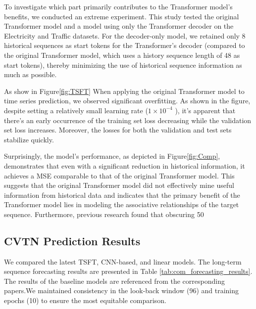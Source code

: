 To investigate which part primarily contributes to the Transformer model's benefits, we conducted an extreme experiment. This study tested the original Transformer model and a model using only the Transformer decoder on the Electricity and Traffic datasets. For the decoder-only model, we retained only 8 historical sequences as start tokens for the Transformer's decoder (compared to the original Transformer model, which uses a history sequence length of 48 as start tokens), thereby minimizing the use of historical sequence information as much as possible.

As show in Figure\ref{fig:TSFT} When applying the original Transformer model to time series prediction, we observed significant overfitting. As shown in the figure, despite setting a relatively small learning rate (\(1 \times 10^{-4}\)
), it's apparent that there's an early occurrence of the training set loss decreasing while the validation set loss increases. Moreover, the losses for both the validation and test sets stabilize quickly.



Surprisingly, the model's performance, as depicted in Figure\ref{fig:Comp}, demonstrates that even with a significant reduction in historical information, it achieves a MSE comparable to that of the original Transformer model. This suggests that the original Transformer model did not effectively mine useful information from historical data and indicates that the primary benefit of the Transformer model lies in modeling the associative relationships of the target sequence. Furthermore, previous research\cite{gao2023client} found that obscuring 50\

\subsection{CVTN Prediction Results}
We compared the latest TSFT\cite{wu2022timesnet,gao2023client, zhang2022less,zhou2022fedformer,liu2021pyraformer, Zhou_Zhang_Peng_Zhang_Li_Xiong_Zhang_2022,liu2023itransformer, wu2021autoformer}, CNN-based\cite{wu2022timesnet}, and linear models\cite{zeng2023transformers}. The long-term sequence forecasting results are presented in Table \ref{tab:com_forecasting_results}. The results of the baseline models are referenced from the corresponding papers\cite{wu2022timesnet,gao2023client,liu2023itransformer}.We maintained consistency in the look-back window (96) and training epochs (10) to ensure the most equitable comparison. 

